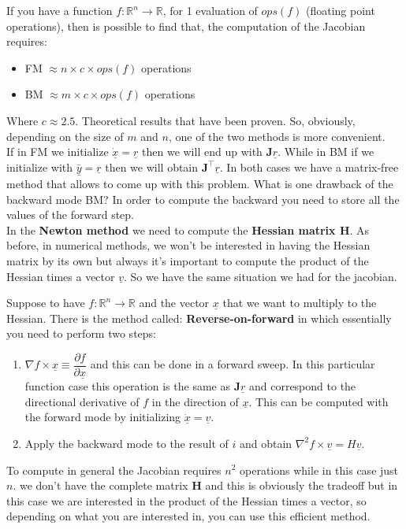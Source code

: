 If you have a function $f: \mathbb{R}^n \to \mathbb{R}$, for 1 evaluation of $ops(f)$ (floating point operations), then is possible to find that, the computation of the Jacobian requires:
\begin{itemize}
    \item FM $\approx n\times c\times ops(f)$ operations
    \item BM $\approx m\times c\times ops(f)$ operations
\end{itemize}
Where $c \approx 2.5$. Theoretical results that have been proven. So, obviously, depending on the size of $m$ and $n$, one of the two methods is more convenient.\\

If in FM we initialize $\underline{\dot{x}} = \underline{r}$ then we will end up with $\mathbf{J}\underline{r}$. While in BM if we initialize with $\bar{\underline{y}} = \underline{r}$ then we will obtain $\mathbf{J}^\intercal \underline{r}$. In both cases we have a matrix-free method that allows to come up with this problem. What is one drawback of the backward mode BM? In order to compute the backward you need to store all the values of the forward step.\\

In the \textbf{Newton method} we need to compute the \textbf{Hessian matrix $\mathbf{H}$}. As before, in numerical methods, we won't be interested in having the Hessian matrix by its own but always it's important to compute the product of the Hessian times a vector $\underline{v}$. So we have the same situation we had for the jacobian.  

Suppose to have $f: \mathbb{R}^n \to \mathbb{R}$ and the vector $\underline{x}$ that we want to multiply to the Hessian. There is the method called: \textbf{Reverse-on-forward} in which essentially you need to perform two steps:
\begin{enumerate}[i]
    \item $\nabla f \times \underline{x} \equiv \dfrac{\partial f}{\partial \underline{x}}$ and this can be done in a forward sweep. In this particular function case this operation is the same as $\mathbf{J}\underline{r}$ and correspond to the directional derivative of $f$ in the direction of $\underline{x}$. This can be computed with the forward mode by initializing $\underline{\dot{x}} = \underline{v}$.
    \item Apply the backward mode to the result of $i$ and obtain $\nabla^2 f \times  \underline{v} = H \underline{v}$. 
\end{enumerate} 
To compute in general the Jacobian requires $n^2$ operations while in this case just $n$. we don't have the complete matrix $\mathbf{H}$ and this is obviously the tradeoff but in this case we are interested in the product of the Hessian times a vector, so depending on what you are interested in, you can use this efficient method.\\